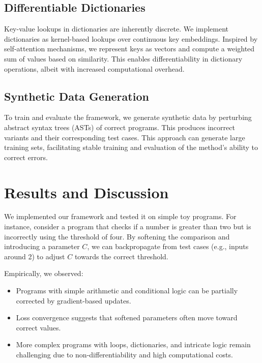 \documentclass{article}
\begin{document}
\subsection{Differentiable Dictionaries}
Key-value lookups in dictionaries are inherently discrete. We implement dictionaries as kernel-based lookups over continuous key embeddings. Inspired by self-attention mechanisms, we represent keys as vectors and compute a weighted sum of values based on similarity. This enables differentiability in dictionary operations, albeit with increased computational overhead.

\subsection{Synthetic Data Generation}
To train and evaluate the framework, we generate synthetic data by perturbing abstract syntax trees (ASTs) of correct programs. This produces incorrect variants and their corresponding test cases. This approach can generate large training sets, facilitating stable training and evaluation of the method’s ability to correct errors.

\section{Results and Discussion}
We implemented our framework and tested it on simple toy programs. For instance, consider a program that checks if a number is greater than two but is incorrectly using the threshold of four. By softening the comparison and introducing a parameter $C$, we can backpropagate from test cases (e.g., inputs around 2) to adjust $C$ towards the correct threshold.

Empirically, we observed:
\begin{itemize}
    \item Programs with simple arithmetic and conditional logic can be partially corrected by gradient-based updates.
    \item Loss convergence suggests that softened parameters often move toward correct values.
    \item More complex programs with loops, dictionaries, and intricate logic remain challenging due to non-differentiability and high computational costs.
\end{itemize}
\end{document}
